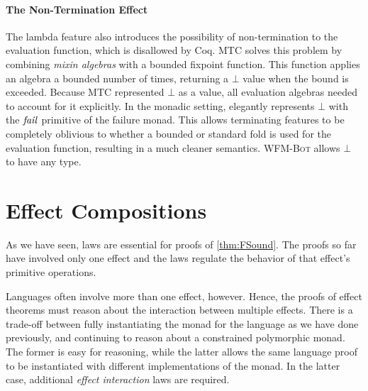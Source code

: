 \paragraph{The Non-Termination Effect}
The lambda feature also introduces the possibility of non-termination to the
evaluation function, which is disallowed by Coq. MTC solves this problem by
combining \textit{mixin algebras} with a bounded fixpoint function. This
function applies an algebra a bounded number of times, returning a $\bot$ value
when the bound is exceeded.  Because MTC represented $\bot$ as a value, all
evaluation algebras needed to account for it explicitly. In the monadic
setting, \name elegantly represents $\bot$ with the \ensuremath{\Varid{fail}} primitive of the
failure  monad. This allows terminating features to be completely oblivious to
whether a bounded or standard fold is used for the evaluation function,
resulting in a much cleaner semantics. \textsc{WFM-Bot} allows $\bot$ to have any type.

\section{Effect Compositions}

As we have seen, laws are essential for proofs of
\ref{thm:FSound}. The proofs so far have involved only one effect and
the laws regulate the behavior of that effect's primitive operations.

Languages often involve more than one effect, however. Hence, the
proofs of effect theorems must reason about the interaction between
multiple effects.  There is a trade-off between fully instantiating
the monad for the language as we have done previously, and continuing
to reason about a constrained polymorphic monad. The former is easy
for reasoning, while the latter allows the same language proof to be
instantiated with different implementations of the monad. In the latter case,
additional \emph{effect interaction} laws are required.


